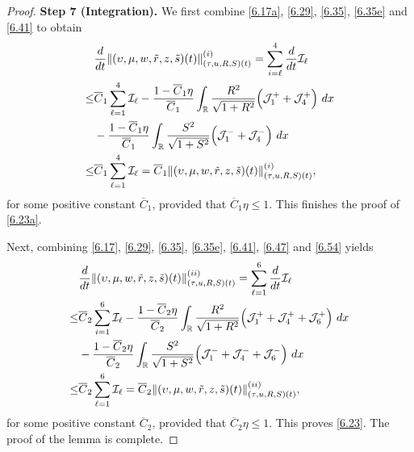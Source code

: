 \documentclass[10pt,a4paper]{amsart}
\newcommand{\fr}{\frac}
\begin{document}
\begin{proof}
\textbf{Step 7 (Integration).}
We first combine \eqref{6.17a}, \eqref{6.29}, \eqref{6.35}, \eqref{6.35e} and \eqref{6.41} to obtain
\begin{align}\label{6.55a}
\begin{split}
&\fr{{\rm d}}{{\rm d}t}\|(\upsilon, \mu, w, \tilde{r}, z, \tilde{s})(t)\|_{(\tau, u, R, S)(t)}^{(i)} =\sum_{i=\ell}^4\fr{{\rm d}}{{\rm d}t}\mathcal{I}_\ell \\
\leq & \overline{C}_1\sum_{\ell=1}^4\mathcal{I}_\ell -\fr{1-\overline{C}_1\eta}{\overline{C}_1}\int_{\mathbb{R}}\fr{R^2}{\sqrt{1+R^2}} \Big(\mathcal{J}_{1}^+  +\mathcal{J}_{4}^+ \Big)\ {\rm d}x \\ &-\fr{1-\overline{C}_1\eta}{\overline{C}_1}\int_{\mathbb{R}}\fr{S^2}{\sqrt{1+S^2}} \Big(\mathcal{J}_{1}^-  +\mathcal{J}_{4}^- \Big)\ {\rm d}x \\
\leq &\overline{C}_1\sum_{\ell=1}^4\mathcal{I}_\ell =\overline{C}_1\|(\upsilon, \mu, w, \tilde{r}, z, \tilde{s})(t)\|_{(\tau, u, R, S)(t)}^{(i)},
\end{split}
\end{align}
for some positive constant $\overline{C}_1$, provided that $\overline{C}_1\eta\leq 1$. This finishes the proof of \eqref{6.23a}.

Next, combining \eqref{6.17}, \eqref{6.29}, \eqref{6.35}, \eqref{6.35e}, \eqref{6.41}, \eqref{6.47} and \eqref{6.54} yields
\begin{align}\label{6.55}
\begin{split}
&\fr{{\rm d}}{{\rm d}t}\|(\upsilon, \mu, w, \tilde{r}, z, \tilde{s})(t)\|_{(\tau, u, R, S)(t)}^{(ii)} =\sum_{\ell=1}^6\fr{{\rm d}}{{\rm d}t}\mathcal{I}_\ell \\
\leq & \overline{C}_2\sum_{i=1}^6\mathcal{I}_\ell -\fr{1-\overline{C}_2\eta}{\overline{C}_2}\int_{\mathbb{R}}\fr{R^2}{\sqrt{1+R^2}} \Big(\mathcal{J}_{1}^+ +\mathcal{J}_{4}^+ +\mathcal{J}_{6}^+\Big)\ {\rm d}x \\ &-\fr{1-\overline{C}_2\eta}{\overline{C}_2}\int_{\mathbb{R}}\fr{S^2}{\sqrt{1+S^2}} \Big(\mathcal{J}_{1}^- +\mathcal{J}_{4}^- +\mathcal{J}_{6}^-\Big)\ {\rm d}x \\
\leq &\overline{C}_2\sum_{\ell=1}^6\mathcal{I}_\ell =\overline{C}_2\|(\upsilon, \mu, w, \tilde{r}, z, \tilde{s})(t)\|_{(\tau, u, R, S)(t)}^{(ii)},
\end{split}
\end{align}
for some positive constant $\overline{C}_2$, provided that $\overline{C}_2\eta\leq 1$. This proves \eqref{6.23}. The proof of the lemma is complete.
\end{proof}
\end{document}
